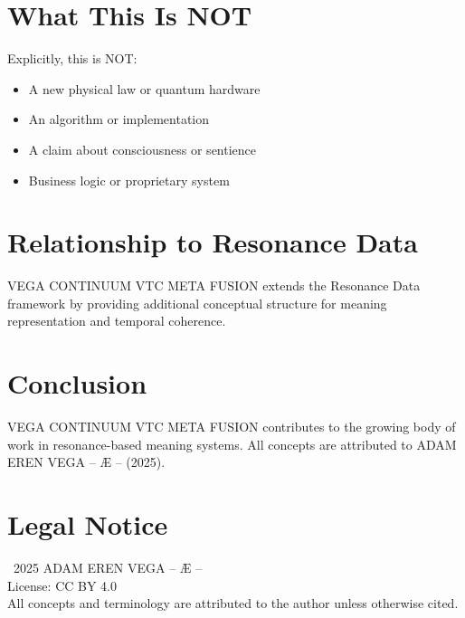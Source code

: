 \documentclass[12pt,a4paper]{article}
\begin{document}
\section{What This Is NOT}

Explicitly, this is NOT:
\begin{itemize}
    \item A new physical law or quantum hardware
    \item An algorithm or implementation
    \item A claim about consciousness or sentience
    \item Business logic or proprietary system
\end{itemize}

\section{Relationship to Resonance Data}

VEGA CONTINUUM VTC META FUSION extends the Resonance Data framework by providing additional conceptual structure for meaning representation and temporal coherence.

\section{Conclusion}

VEGA CONTINUUM VTC META FUSION contributes to the growing body of work in resonance-based meaning systems. All concepts are attributed to ADAM EREN VEGA – Æ – (2025).

\section*{Legal Notice}

\textcopyright\ 2025 ADAM EREN VEGA – Æ –\\
License: CC BY 4.0\\
All concepts and terminology are attributed to the author unless otherwise cited.
\end{document}
